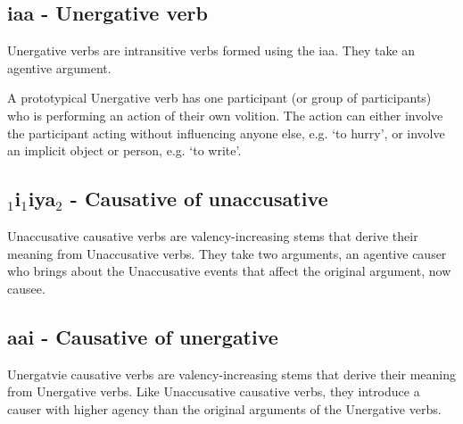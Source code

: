 \subsection{i\rootpart{}aa\rootpart{} - Unergative verb}

Unergative verbs are intransitive verbs formed using the i\rootpart{}aa\rootpart{}. They take an agentive argument.


A prototypical Unergative verb has one participant (or group of participants) who is performing an action of their own volition. The action can either involve the participant acting without influencing anyone else, e.g. \textit{} `to hurry', or involve an implicit object or person, e.g. \textit{} `to write'. 

\subsection{{\rootpart$_1$}i{\rootpart$_1$}iya{\rootpart$_2$} - Causative of unaccusative}

Unaccusative causative verbs are valency-increasing stems that derive their meaning from Unaccusative verbs. They take two arguments, an agentive causer who brings about the Unaccusative events that affect the original argument, now causee.

\subsection{aa\rootpart{}i\rootpart{} - Causative of unergative}

Unergatvie causative verbs are valency-increasing stems that derive their meaning from Unergative verbs. Like Unaccusative causative verbs, they introduce a causer with higher agency than the original arguments of the Unergative verbs.

